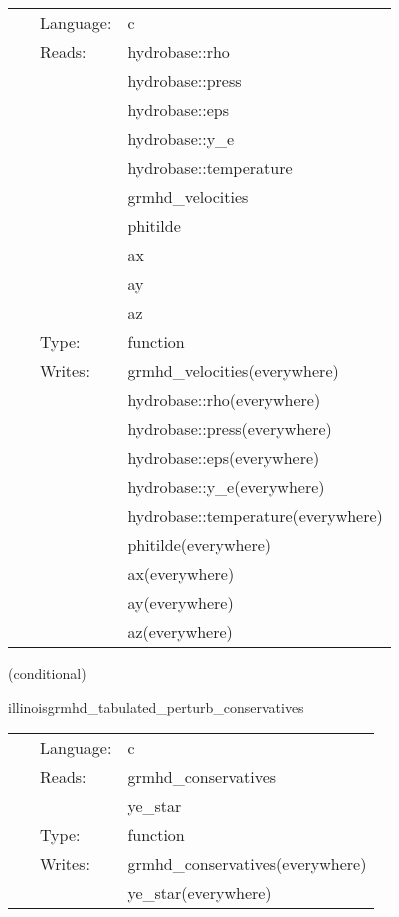 \documentclass{article}
\begin{document}
 \begin{tabular*}{160mm}{cll} 
~ & Language:  & c \\ 
~ & Reads:  & hydrobase::rho \\ 
~& ~ &hydrobase::press\\ 
~& ~ &hydrobase::eps\\ 
~& ~ &hydrobase::y\_e\\ 
~& ~ &hydrobase::temperature\\ 
~& ~ &grmhd\_velocities\\ 
~& ~ &phitilde\\ 
~& ~ &ax\\ 
~& ~ &ay\\ 
~& ~ &az\\ 
~ & Type:  & function \\ 
~ & Writes:  & grmhd\_velocities(everywhere) \\ 
~& ~ &hydrobase::rho(everywhere)\\ 
~& ~ &hydrobase::press(everywhere)\\ 
~& ~ &hydrobase::eps(everywhere)\\ 
~& ~ &hydrobase::y\_e(everywhere)\\ 
~& ~ &hydrobase::temperature(everywhere)\\ 
~& ~ &phitilde(everywhere)\\ 
~& ~ &ax(everywhere)\\ 
~& ~ &ay(everywhere)\\ 
~& ~ &az(everywhere)\\ 
\end{tabular*} 


\vspace{5mm}

   (conditional) 

\hspace{5mm} illinoisgrmhd\_tabulated\_perturb\_conservatives 

\hspace{5mm}{\it tabulated version of illinoisgrmhd\_perturb\_conservatives } 


\hspace{5mm}

 \begin{tabular*}{160mm}{cll} 
~ & Language:  & c \\ 
~ & Reads:  & grmhd\_conservatives \\ 
~& ~ &ye\_star\\ 
~ & Type:  & function \\ 
~ & Writes:  & grmhd\_conservatives(everywhere) \\ 
~& ~ &ye\_star(everywhere)\\ 
\end{tabular*} 
\end{document}
